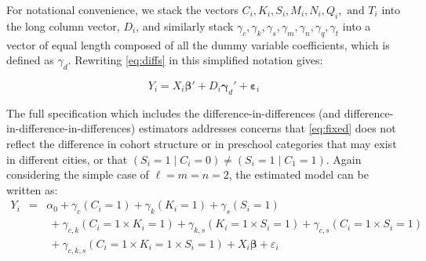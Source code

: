 \documentclass[11pt]{article}
\begin{document}
For notational convenience, we stack the vectors $C_i, K_i, S_i, M_i, N_i, Q_i, \text{ and } T_i$ into the long column vector, $D_i$, and similarly stack $\gamma_c, \gamma_k, \gamma_s, \gamma_m, \gamma_n, \gamma_q, \gamma_t $ into a vector of equal length composed of all the dummy variable coefficients, which is defined  as $\gamma_d$. Rewriting \ref{eq:diffs} in this simplified notation gives:

\begin{equation}
Y_i = X_i \boldsymbol{\beta}' + D_i \boldsymbol{\gamma}_d' + \boldsymbol{\varepsilon}_{i}
\end{equation}

The full specification which includes the difference-in-differences (and difference-in-difference-in-differences) estimators addresses concerns that \ref{eq:fixed} does not reflect the difference in cohort structure or in preschool categories that may exist in different cities, or that $(S_i = 1 \mid C_i = 0) \neq (S_i = 1 \mid C_1 =1)$. Again considering the simple case of $\ell = m = n = 2$, the estimated model can be written as:
\begin{eqnarray*}  \label{eq:specific2}
Y_i & = & \alpha_0  + \gamma_c (C_i = 1) + \gamma_k (K_i = 1) + \gamma_s (S_i = 1) \nonumber \\
& &\ + \gamma_{c,k} (C_i = 1 \times K_i = 1) + \gamma_{k,s} (K_i = 1 \times S_i = 1)  + \gamma_{c,s} (C_i = 1 \times S_i = 1)   \nonumber \\
 & &\ + \gamma_{c,k,s}(C_i = 1 \times K_i = 1 \times S_i = 1) + X_i \boldsymbol{\beta} + \varepsilon_i  
\end{eqnarray*}
\end{document}
